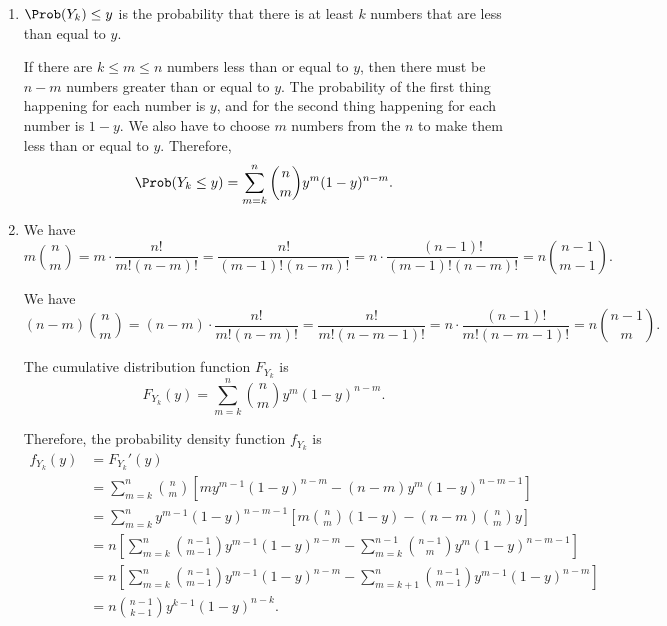 \Question{\currfilebase}

\begin{enumerate}
    \item \(\Prob(Y_k) \leq y\) is the probability that there is at least \(k\) numbers that are less than equal to \(y\).

          If there are \(k \leq m \leq n\) numbers less than or equal to \(y\), then there must be \(n - m\) numbers greater than or equal to \(y\). The probability of the first thing happening for each number is \(y\), and for the second thing happening for each number is \(1 - y\). We also have to choose \(m\) numbers from the \(n\) to make them less than or equal to \(y\). Therefore,
          \[
              \Prob(Y_k \leq y) = \sum_{m = k}^{n} \binom{n}{m} y^m (1 - y)^{n - m}.
          \]

    \item We have
          \[
              m \binom{n}{m} = m \cdot \frac{n!}{m! (n - m)!} = \frac{n!}{(m - 1)! (n - m)!} = n \cdot \frac{(n - 1)!}{(m - 1)! (n - m)!} = n \binom{n - 1}{m - 1}.
          \]

          We have
          \[
              (n - m) \binom{n}{m} = (n - m) \cdot \frac{n!}{m! (n - m)!} = \frac{n!}{m! (n - m - 1)!} = n \cdot \frac{(n - 1)!}{m!(n - m - 1)!} = n \binom{n - 1}{m}.
          \]

          The cumulative distribution function \(F_{Y_k}\) is
          \[
              F_{Y_k}(y) = \sum_{m = k}^{n} \binom{n}{m} y^m (1 - y)^{n - m}.
          \]

          Therefore, the probability density function \(f_{Y_k}\) is
          \begin{align*}
              f_{Y_k}(y) & = F_{Y_k}'(y)                                                                                                                                           \\
                         & = \sum_{m = k}^{n} \binom{n}{m} \left[m y^{m - 1} (1 - y)^{n - m} - (n - m) y^{m} (1 - y)^{n - m - 1}\right]                                            \\
                         & = \sum_{m = k}^{n} y^{m - 1} (1 - y)^{n - m - 1} \left[m \binom{n}{m} (1 - y) - (n - m) \binom{n}{m} y\right]                                           \\
                         & = n \left[\sum_{m = k}^{n} \binom{n - 1}{m - 1} y^{m - 1} (1 - y)^{n - m} - \sum_{m = k}^{n - 1} \binom{n - 1}{m} y^{m} (1 - y)^{n - m - 1} \right]     \\
                         & = n \left[\sum_{m = k}^{n} \binom{n - 1}{m - 1} y^{m - 1} (1 - y)^{n - m} - \sum_{m = k + 1}^{n} \binom{n - 1}{m - 1} y^{m - 1} (1 - y)^{n - m} \right] \\
                         & = n \binom{n - 1}{k - 1} y^{k - 1} (1 - y)^{n - k}.
          \end{align*}


\end{enumerate}
